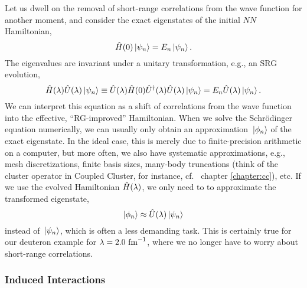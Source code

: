 Let us dwell on the removal of short-range correlations from
the wave function for another moment, and consider the exact eigenstates of
the initial $NN$ Hamiltonian, 
\begin{equation}
  \hat{H}(0) \,|{\psi_n}\rangle = E_n \,|{\psi_n}\rangle\,.
\end{equation}
The eigenvalues are invariant under a unitary transformation, e.g.,
an SRG evolution,
\begin{equation}
  \hat{H}(\lambda)\hat{U}(\lambda)\,|{\psi_n}\rangle \equiv \hat{U}(\lambda) \hat{H}(0) \hat{U}^\dag(\lambda) \hat{U}(\lambda)\,|{\psi_n}\rangle 
    = E_n \hat{U}(\lambda) \,|{\psi_n}\rangle\,.
\end{equation}
We can interpret this equation as a shift of correlations from the
wave function into the effective, ``RG-improved'' Hamiltonian. When
we solve the Schr\"odinger equation numerically, we can usually only
obtain an approximation $\,|{\phi_n}\rangle$ of the exact eigenstate. In 
the ideal case, this is merely due to finite-precision arithmetic on
a computer, but more often, we also have systematic approximations,
e.g., mesh discretizations, finite basis sizes, many-body truncations 
(think of the cluster operator in Coupled Cluster, for instance, cf.~
chapter \ref{chapter:cc}), etc.
If we use the evolved Hamiltonian $\hat{H}(\lambda)$, we only need to 
to approximate the transformed eigenstate,
\begin{equation}\label{eq:approx_eigenstate}
  \ket{\phi_n}\approx\UO(\lambda)\ket{\psi_n}\,
\end{equation}
instead of $\,|{\psi_n}\rangle$, which is often a less demanding task.
This is certainly true for our deuteron example for $\lambda=2.0\,\,\text{fm}^{-1}$,
where we no longer have to worry about short-range correlations.


\subsubsection{\label{sec:srg_induced}Induced Interactions}



